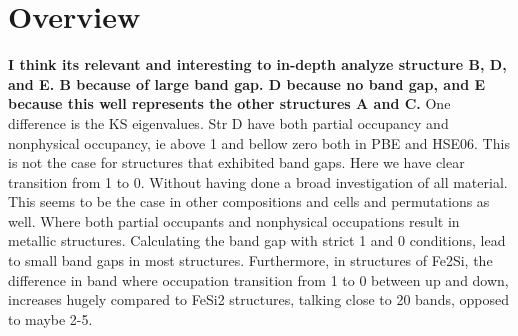\section{Overview}


\textbf{I think its relevant and interesting to in-depth analyze structure B, D, and E. B because of large band gap. D because no band gap, and E because this well represents the other structures A and C. }
One difference is the KS eigenvalues. Str D have both partial occupancy and nonphysical occupancy, ie above 1 and bellow zero both in PBE and HSE06. This is not the case for structures that exhibited band gaps. Here we have clear transition from 1 to 0. Without having done a broad investigation of all material. This seems to be the case in other compositions and cells and permutations as well. Where both partial occupants and nonphysical occupations result in metallic structures. Calculating the band gap with strict 1 and 0 conditions, lead to small band gaps in most structures. Furthermore, in structures of Fe2Si, the difference in band where occupation transition from 1 to 0 between up and down, increases hugely compared to FeSi2 structures, talking close to 20 bands, opposed to maybe 2-5. 
